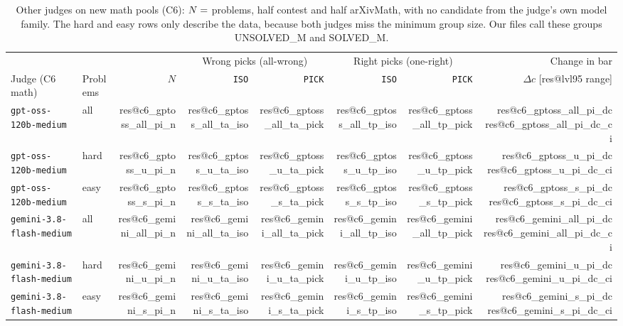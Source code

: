 \documentclass[10pt,twocolumn]{article}
\makeatletter
\newcommand{\res}[1]{\csname res@#1\endcsname}
\makeatother
\begin{document}
\begin{table}[t]
\centering\footnotesize
\setlength{\tabcolsep}{4.5pt}
\begin{tabular}{llrrrrrr}
\toprule
 & & & \multicolumn{2}{c}{Wrong picks (all-wrong)} & \multicolumn{2}{c}{Right picks (one-right)} & Change in bar \\
Judge (C6 math) & Problems & $N$ & \texttt{ISO} & \texttt{PICK} & \texttt{ISO} & \texttt{PICK} & $\Delta c$ [\res{lvl95} range] \\
\midrule
\texttt{gpt-oss-120b-medium} & all & \res{c6_gptoss_all_pi_n} & \res{c6_gptoss_all_ta_iso} & \res{c6_gptoss_all_ta_pick} & \res{c6_gptoss_all_tp_iso} & \res{c6_gptoss_all_tp_pick} & \res{c6_gptoss_all_pi_dc} \res{c6_gptoss_all_pi_dc_ci} \\
\texttt{gpt-oss-120b-medium} & hard & \res{c6_gptoss_u_pi_n} & \res{c6_gptoss_u_ta_iso} & \res{c6_gptoss_u_ta_pick} & \res{c6_gptoss_u_tp_iso} & \res{c6_gptoss_u_tp_pick} & \res{c6_gptoss_u_pi_dc} \res{c6_gptoss_u_pi_dc_ci} \\
\texttt{gpt-oss-120b-medium} & easy & \res{c6_gptoss_s_pi_n} & \res{c6_gptoss_s_ta_iso} & \res{c6_gptoss_s_ta_pick} & \res{c6_gptoss_s_tp_iso} & \res{c6_gptoss_s_tp_pick} & \res{c6_gptoss_s_pi_dc} \res{c6_gptoss_s_pi_dc_ci} \\
\midrule
\texttt{gemini-3.8-flash-medium} & all & \res{c6_gemini_all_pi_n} & \res{c6_gemini_all_ta_iso} & \res{c6_gemini_all_ta_pick} & \res{c6_gemini_all_tp_iso} & \res{c6_gemini_all_tp_pick} & \res{c6_gemini_all_pi_dc} \res{c6_gemini_all_pi_dc_ci} \\
\texttt{gemini-3.8-flash-medium} & hard & \res{c6_gemini_u_pi_n} & \res{c6_gemini_u_ta_iso} & \res{c6_gemini_u_ta_pick} & \res{c6_gemini_u_tp_iso} & \res{c6_gemini_u_tp_pick} & \res{c6_gemini_u_pi_dc} \res{c6_gemini_u_pi_dc_ci} \\
\texttt{gemini-3.8-flash-medium} & easy & \res{c6_gemini_s_pi_n} & \res{c6_gemini_s_ta_iso} & \res{c6_gemini_s_ta_pick} & \res{c6_gemini_s_tp_iso} & \res{c6_gemini_s_tp_pick} & \res{c6_gemini_s_pi_dc} \res{c6_gemini_s_pi_dc_ci} \\
\bottomrule
\end{tabular}
\caption{Other judges on new math pools (C6): $N=\res{c6_n_problems}$ problems, half contest and half arXivMath, with no candidate from the judge's own model family. The hard and easy rows only describe the data, because both judges miss the minimum group size. Our files call these groups UNSOLVED\_M and SOLVED\_M.}
\label{tab:c6math}
\end{table}
\end{document}
